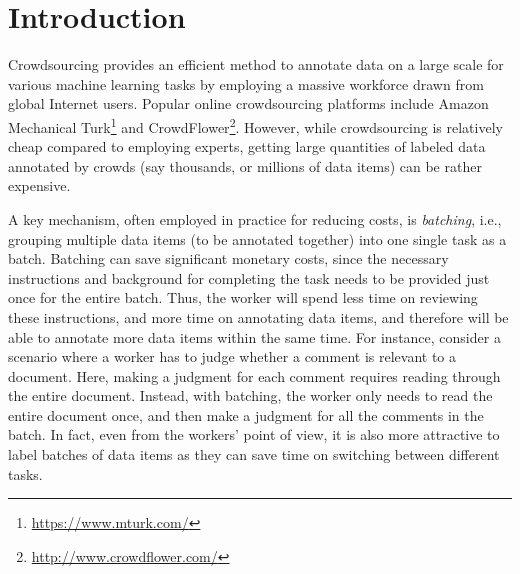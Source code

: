 

\section{Introduction}
\label{sec:intro}

Crowdsourcing provides an efficient method 
to annotate data on a large scale for various machine learning tasks
by employing a massive workforce drawn from global Internet users.
Popular online crowdsourcing platforms include
Amazon Mechanical Turk\footnote{\url{https://www.mturk.com/}} and CrowdFlower\footnote{\url{http://www.crowdflower.com/}}.
However, while crowdsourcing is relatively cheap compared
to employing experts, getting large quantities of labeled data
annotated by crowds (say thousands, or millions of data items) 
can be rather expensive. 

A key mechanism, often employed in practice for reducing costs, is {\em batching},
i.e., grouping multiple data items (to be annotated together) into one single
task as a batch. 
Batching can save significant monetary costs, since the necessary instructions
and background for completing the task needs to be provided just once
for the entire batch. 
Thus, the worker will spend less time on reviewing these instructions, 
and more time on annotating data items, and therefore will be able to
annotate more data items within the same time. 
For instance, consider a scenario where a worker has to judge whether
a comment is relevant to a document. 
Here, making a judgment for each comment requires reading through the entire 
document.
Instead, with batching, the worker only needs to read the entire document
once, and then make a judgment for all the comments in the batch. 
In fact, even from the workers' point of view,
it is also more attractive to label batches of data items
as they can save time on switching between different tasks.

